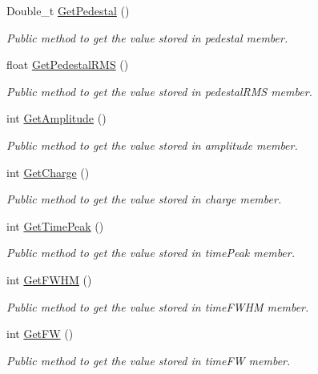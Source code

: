 \begin{DoxyCompactItemize}
Double\+\_\+t \hyperlink{classPulse_a40819da67d9c6494b0171c32d4b5ea42}{Get\+Pedestal} ()
\begin{DoxyCompactList}\small\item\em Public method to get the value stored in pedestal member. \end{DoxyCompactList}\item 
float \hyperlink{classPulse_ad1c6b05032aaae9972b80566e5cd7c35}{Get\+Pedestal\+R\+MS} ()
\begin{DoxyCompactList}\small\item\em Public method to get the value stored in pedestal\+R\+MS member. \end{DoxyCompactList}\item 
int \hyperlink{classPulse_a89afa9f7773d73122d7b0926382e30d3}{Get\+Amplitude} ()
\begin{DoxyCompactList}\small\item\em Public method to get the value stored in amplitude member. \end{DoxyCompactList}\item 
int \hyperlink{classPulse_a74658eb6ed6d5ad2dadf3e3642a687a2}{Get\+Charge} ()
\begin{DoxyCompactList}\small\item\em Public method to get the value stored in charge member. \end{DoxyCompactList}\item 
int \hyperlink{classPulse_aab7891a017015171250c3e290ac4a3eb}{Get\+Time\+Peak} ()
\begin{DoxyCompactList}\small\item\em Public method to get the value stored in time\+Peak member. \end{DoxyCompactList}\item 
int \hyperlink{classPulse_a726a4179243d4386a909e5d21b2b1c9f}{Get\+F\+W\+HM} ()
\begin{DoxyCompactList}\small\item\em Public method to get the value stored in time\+F\+W\+HM member. \end{DoxyCompactList}\item 
int \hyperlink{classPulse_a4f92bb4c6f55908515a6bffdac10e81e}{Get\+FW} ()
\begin{DoxyCompactList}\small\item\em Public method to get the value stored in time\+FW member. \end{DoxyCompactList}\end{DoxyCompactItemize}

